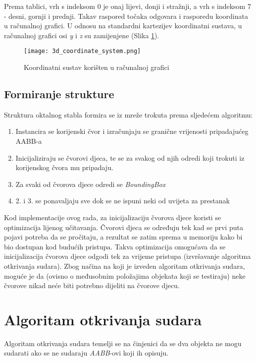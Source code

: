 Prema tablici, vrh s indeksom 0 je onaj lijevi, donji i stražnji, a vrh s indeksom 7 - desni, gornji i prednji.
Takav raspored točaka odgovara i rasporedu koordinata u računalnoj grafici. U odnosu na standardni kartezijev
koordinatni sustava, u računalnoj grafici osi \textit{y} i \textit{z} su zamijenjene (Slika \ref{coordinate-system}).


\begin{figure}[ht]
    \centering
    \texttt{[image: 3d\_coordinate\_system.png]}
    \caption {Koordinatni sustav korišten u računalnoj grafici}
    \label{coordinate-system}
\end{figure}

\pagebreak
\subsection{Formiranje strukture}

Struktura oktalnog stabla formira se iz mreže trokuta prema sljedećem algoritmu:
\begin{enumerate}
  \item Instancira se korijenski čvor i izračunjaju se granične vrijenosti pripadajućeg AABB-a
  \item Inicijaliziraju se čvorovi djeca, te se za svakog od njih odredi koji trokuti iz korijenskog čvora mu pripadaju.
  \item Za svaki od čvorova djece odredi se \textit{BoundingBox}
  \item 2. i 3. se ponavaljaju sve dok se ne ispuni neki od uvijeta za prestanak
\end{enumerate}

Kod implementacije ovog rada, za inicijalizaciju čvorova djece koristi se optimizacija lijenog učitavanja. Čvorovi djeca se određuju
tek kad se prvi puta pojavi potreba da se pročitaju, a rezultat se zatim sprema u memoriju kako bi bio dostupan kod budućih pristupa.
Takva optimizacija omogućava da se inicijalizacija čvorova djece odgodi tek za vrijeme pristupa (izvršavanje algoritma otkrivanja sudara).
Zbog načina na koji je izveden algoritam otkrivanja sudara, moguće je da (ovisno o međusobnim položajima objekata koji se testiraju)
neke čvorove nikad neće biti potrebno dijeliti na čvorove djecu.

\section{Algoritam otkrivanja sudara}

Algoritam otkrivanja sudara temelji se na činjenici da se dva objekta ne mogu sudarati ako se ne sudaraju \textit{AABB}-ovi koji ih opisuju.


